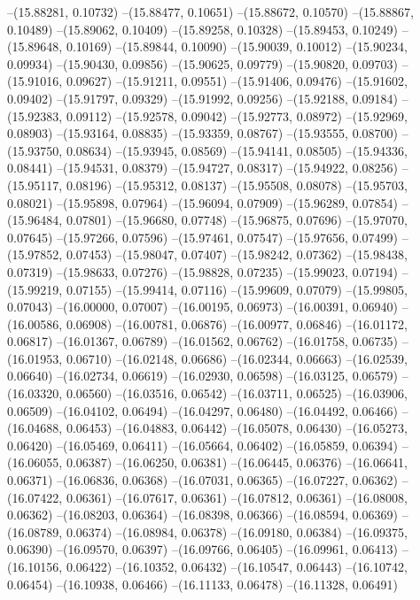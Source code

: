 --(15.88281, 0.10732)
--(15.88477, 0.10651)
--(15.88672, 0.10570)
--(15.88867, 0.10489)
--(15.89062, 0.10409)
--(15.89258, 0.10328)
--(15.89453, 0.10249)
--(15.89648, 0.10169)
--(15.89844, 0.10090)
--(15.90039, 0.10012)
--(15.90234, 0.09934)
--(15.90430, 0.09856)
--(15.90625, 0.09779)
--(15.90820, 0.09703)
--(15.91016, 0.09627)
--(15.91211, 0.09551)
--(15.91406, 0.09476)
--(15.91602, 0.09402)
--(15.91797, 0.09329)
--(15.91992, 0.09256)
--(15.92188, 0.09184)
--(15.92383, 0.09112)
--(15.92578, 0.09042)
--(15.92773, 0.08972)
--(15.92969, 0.08903)
--(15.93164, 0.08835)
--(15.93359, 0.08767)
--(15.93555, 0.08700)
--(15.93750, 0.08634)
--(15.93945, 0.08569)
--(15.94141, 0.08505)
--(15.94336, 0.08441)
--(15.94531, 0.08379)
--(15.94727, 0.08317)
--(15.94922, 0.08256)
--(15.95117, 0.08196)
--(15.95312, 0.08137)
--(15.95508, 0.08078)
--(15.95703, 0.08021)
--(15.95898, 0.07964)
--(15.96094, 0.07909)
--(15.96289, 0.07854)
--(15.96484, 0.07801)
--(15.96680, 0.07748)
--(15.96875, 0.07696)
--(15.97070, 0.07645)
--(15.97266, 0.07596)
--(15.97461, 0.07547)
--(15.97656, 0.07499)
--(15.97852, 0.07453)
--(15.98047, 0.07407)
--(15.98242, 0.07362)
--(15.98438, 0.07319)
--(15.98633, 0.07276)
--(15.98828, 0.07235)
--(15.99023, 0.07194)
--(15.99219, 0.07155)
--(15.99414, 0.07116)
--(15.99609, 0.07079)
--(15.99805, 0.07043)
--(16.00000, 0.07007)
--(16.00195, 0.06973)
--(16.00391, 0.06940)
--(16.00586, 0.06908)
--(16.00781, 0.06876)
--(16.00977, 0.06846)
--(16.01172, 0.06817)
--(16.01367, 0.06789)
--(16.01562, 0.06762)
--(16.01758, 0.06735)
--(16.01953, 0.06710)
--(16.02148, 0.06686)
--(16.02344, 0.06663)
--(16.02539, 0.06640)
--(16.02734, 0.06619)
--(16.02930, 0.06598)
--(16.03125, 0.06579)
--(16.03320, 0.06560)
--(16.03516, 0.06542)
--(16.03711, 0.06525)
--(16.03906, 0.06509)
--(16.04102, 0.06494)
--(16.04297, 0.06480)
--(16.04492, 0.06466)
--(16.04688, 0.06453)
--(16.04883, 0.06442)
--(16.05078, 0.06430)
--(16.05273, 0.06420)
--(16.05469, 0.06411)
--(16.05664, 0.06402)
--(16.05859, 0.06394)
--(16.06055, 0.06387)
--(16.06250, 0.06381)
--(16.06445, 0.06376)
--(16.06641, 0.06371)
--(16.06836, 0.06368)
--(16.07031, 0.06365)
--(16.07227, 0.06362)
--(16.07422, 0.06361)
--(16.07617, 0.06361)
--(16.07812, 0.06361)
--(16.08008, 0.06362)
--(16.08203, 0.06364)
--(16.08398, 0.06366)
--(16.08594, 0.06369)
--(16.08789, 0.06374)
--(16.08984, 0.06378)
--(16.09180, 0.06384)
--(16.09375, 0.06390)
--(16.09570, 0.06397)
--(16.09766, 0.06405)
--(16.09961, 0.06413)
--(16.10156, 0.06422)
--(16.10352, 0.06432)
--(16.10547, 0.06443)
--(16.10742, 0.06454)
--(16.10938, 0.06466)
--(16.11133, 0.06478)
--(16.11328, 0.06491)
